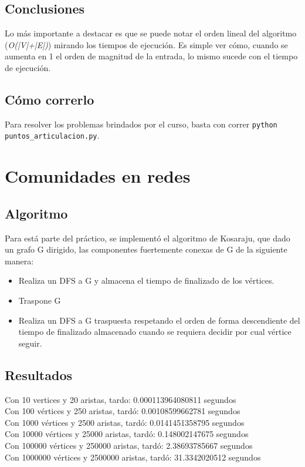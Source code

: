 \documentclass[a4paper,10pt]{article}
\begin{document}
\subsection{Conclusiones}
	Lo más importante a destacar es que se puede notar el orden lineal del algoritmo (\emph{O(|V|+|E|)}) mirando los tiempos de ejecución. Es simple ver cómo, cuando se aumenta en 1 el orden de magnitud de la entrada, lo mismo sucede con el tiempo de ejecución.
\subsection{Cómo correrlo}
	Para resolver los problemas brindados por el curso, basta con correr \texttt{python puntos\_articulacion.py}.

\section{Comunidades en redes}
\subsection{Algoritmo}
	Para está parte del práctico, se implementó el algoritmo de Kosaraju, que dado un grafo G dirigido, las componentes fuertemente conexas de G de la siguiente manera:
	\begin{itemize}
		\item Realiza un DFS a G y almacena el tiempo de finalizado de los vértices.
		\item Traspone G
		\item Realiza un DFS a G traspuesta respetando el orden de forma descendiente del tiempo de finalizado almacenado cuando se requiera decidir por cual vértice seguir.
	\end{itemize}
\subsection{Resultados}
	\noindent Con 10 vertices y 20 aristas, tardo: 0.000113964080811 segundos \\
	Con 100 vértices y 250 aristas, tardó: 0.00108599662781 segundos \\
	Con 1000 vértices y 2500 aristas, tardó: 0.0141451358795 segundos \\
	Con 10000 vértices y 25000 aristas, tardó: 0.148002147675 segundos \\
	Con 100000 vértices y 250000 aristas, tardó: 2.38693785667 segundos \\
	Con 1000000 vértices y 2500000 aristas, tardó: 31.3342020512 segundos
\end{document}
